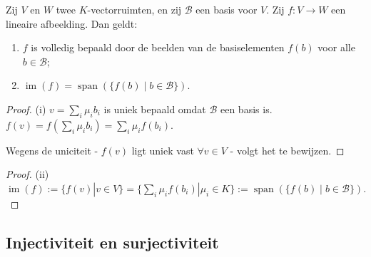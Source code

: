 \begin{lemma}[3.2.6]
    Zij $V$ en $W$ twee $K$-vectorruimten, en zij $\mathcal{B}$ een basis voor $V$. Zij $f \colon V \to W$ een lineaire afbeelding. Dan geldt:
    \begin{enumerate}
        \item[(i)] $f$ is volledig bepaald door de beelden van de basiselementen $f(b)$ voor alle $b \in \mathcal{B}$;
        \item[(ii)] $\operatorname{im}(f) = \operatorname{span}(\{f(b) \mid b \in \mathcal{B}\})$.
    \end{enumerate}
\end{lemma}
\begin{proof}(i)
    \(v = \sum_i \mu_i b_i\) is uniek bepaald omdat \(\mathcal{B}\) een basis is.
    \(
        f(v) = f\left(\sum_i \mu_i b_i\right) = \sum_i \mu_i f(b_i).
    \)

    Wegens de uniciteit - \(f(v)\) ligt uniek vast \(\forall v \in V\) - volgt het te bewijzen.
\end{proof}
\begin{proof}(ii)
    \(
        \operatorname{im}(f)
        := \{f(v)|v\in V\}
        = \{\sum_i \mu_i f(b_i)| \mu_i \in K\}
        := \operatorname{span}(\{f(b) \mid b \in \mathcal{B}\}).
    \)
\end{proof}
\subsection{Injectiviteit en surjectiviteit}

